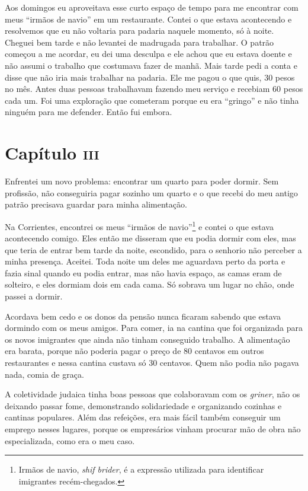Aos domingos eu aproveitava esse curto espaço de tempo para me encontrar
com meus ``irmãos de navio'' em um restaurante. Contei o que estava
acontecendo e resolvemos que eu não voltaria para padaria naquele
momento, só à noite. Cheguei bem tarde e não levantei de madrugada para
trabalhar. O patrão começou a me acordar, eu dei uma desculpa e ele
achou que eu estava doente e não assumi o trabalho que costumava fazer
de manhã. Mais tarde pedi a conta e disse que não iria mais trabalhar na
padaria. Ele me pagou o que quis, 30 pesos no mês. Antes duas pessoas
trabalhavam fazendo meu serviço e recebiam 60 pesos cada um. Foi uma
exploração que cometeram porque eu era ``gringo'' e não tinha ninguém
para me defender. Então fui embora.

\chapter{Capítulo \textsc{iii}}

Enfrentei um novo problema: encontrar um quarto para poder dormir. Sem
profissão, não conseguiria pagar sozinho um quarto e o que recebi do meu
antigo patrão precisava guardar para minha alimentação.

Na Corrientes, encontrei os meus ``irmãos de navio''\footnote{Irmãos de navio, \textit{shif brider}, é a expressão utilizada para identificar imigrantes recém-chegados.} e contei o que estava acontecendo comigo.
Eles então me disseram que eu podia dormir com eles, mas que teria de
entrar bem tarde da noite, escondido, para o senhorio não perceber a
minha presença. Aceitei. Toda noite um deles me aguardava perto da porta
e fazia sinal quando eu podia entrar, mas não havia espaço, as camas
eram de solteiro, e eles dormiam dois em cada cama. Só sobrava um lugar
no chão, onde passei a dormir.

Acordava bem cedo e os donos da pensão nunca ficaram sabendo que estava
dormindo com os meus amigos. Para comer, ia na cantina que foi
organizada para os novos imigrantes que ainda não tinham conseguido
trabalho. A alimentação era barata, porque não poderia pagar o preço de
80 centavos em outros restaurantes e nessa cantina custava só 30
centavos. Quem não podia não pagava nada, comia de graça.

A coletividade judaica tinha boas pessoas que colaboravam com os
\textit{griner}, não os deixando passar fome, demonstrando solidariedade e
organizando cozinhas e cantinas populares. Além das refeições, era mais
fácil também conseguir um emprego nesses lugares, porque os empresários
vinham procurar mão de obra não especializada, como era o meu caso.

